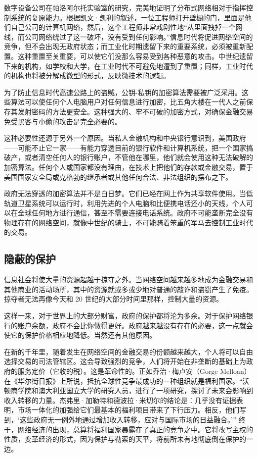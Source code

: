 数字设备公司在帕洛阿尔托实验室的研究，完美地证明了分布式网络相对于指挥控制系统的复原能力。根据凯文·凯利的叙述，一位工程师打开壁橱的门，里面是他们自己公司的计算机网络，然后，这个工程师非常戏剧性地“从里面拽掉一个网线，而公司网络绕过了这一破坏，没有受到任何影响。”信息时代将促进网络空间的竞争，但不会出现无政府状态；而工业化时期遗留下来的重要系统，必须被重新配置。这种重置至关重要，可以使它们没那么容易受到各种恶意的攻击。中世纪遗留下来的机构，如学校和大学，在工业时代不可避免地遭到了重置；同样，工业时代的机构也将被分解成微型的形式，反映微技术的逻辑。

为了防止信息时代高速公路上的盗贼，公钥-私钥的加密算法需要被广泛采用。这些算法可以使任何个人电脑用户对任何信息进行加密，比五角大楼在一代人之前保存其发射密码的方法更安全。这种强大的、牢不可破的加密方式，对确保金融交易免受黑客与小偷的攻击是完全必要的。

这种必要性还源于另外一个原因。当私人金融机构和中央银行意识到，美国政府——可能不止它一家——有能力穿透目前的银行软件和计算机系统，把一个国家搞破产，或者清空任何人的银行账户，不管他在哪里，他们就会使用这种无法破解的加密算法。任何个人或国家都没有理由，在技术上把他们的存款或金融交易，置于美国国家安全局或克格勃的继承者或其他任何合法、非法组织的摆布之下。

政府无法穿透的加密算法并不是白日梦。它们已经在网上作为共享软件使用。当低轨道卫星系统可以运行时，利用先进的个人电脑和比便携电话还小的天线，个人可以在全球任何地方进行通信，甚至不需要连接电话系统。政府不可能垄断完全没有物理存在的网络空间，就像中世纪的骑士，不可能骑着笨重的军马去控制工业时代的交易。

\subsection{隐蔽的保护}
信息社会将使大量的资源超越于掠夺之外。当网络空间越来越多地成为金融交易和其他商业的活动场所，其中的资源就或多或少地对普通的敲诈和盗窃产生了免疫。掠夺者无法再像今天和 20 世纪的大部分时间里那样，控制大量的资源。

这样一来，对于世界上的大部分财富，政府的保护都将沦为多余。对于保护网络银行的账户余额，政府不会比你做得更好。政府越来越没有存在的必要，这一点就会使它的保护价格相应地降低。当然还有其他原因。

在新的千年里，随着发生在网络空间的金融交易的份额越来越大，个人将可以自由选择交易的司法管辖区。这会导致强烈的竞争，人们将开始在非垄断的基础上为政府的服务定价（它收的税）。这是革命性的。正如乔治·梅卢安（Gorge Melloan）在《华尔街日报》上所说，抵抗全球性竞争最成功的一种组织就是福利国家。“沃顿商学院和澳大利亚国立大学的研究人员，进行了一项研究，探讨了未来会影响到收入转移的力量。杰弗里·加勒特和德波拉·米切尔的结论是：几乎没有证据表明，市场一体化的加强给它们最基本的福利项目带来了下行压力。相反，他们写到，‘这些政府无一例外地通过增加收入转移，应对与国际市场的日益融合。’” 终于，网络经济的出现，总算将福利国家暴露在了真正的竞争之中。它将改写主权的性质，变革经济的形式，因为保护与勒索的天平，将前所未有地彻底倒在保护的一边。